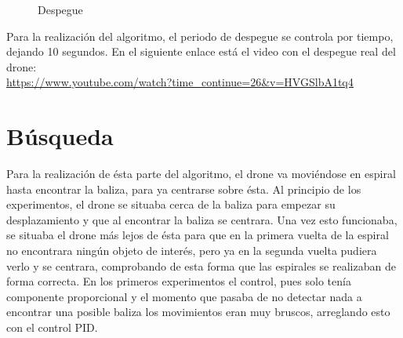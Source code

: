 \begin{figure}[H]
 \centering
 \caption{Despegue}
 \label{f:Test Despegue}
\end{figure}

Para la realizaci\'on del algoritmo, el periodo de despegue se controla por tiempo, dejando 10 segundos. 
En el siguiente enlace est\'a el video con el despegue real del drone:\\
\underline{\url{https://www.youtube.com/watch?time_continue=26&v=HVGSlbA1tq4}}

\section{B\'usqueda }
\hspace{1cm} Para la realizaci\'on de \'esta parte del algoritmo, el drone va movi\'endose en espiral hasta encontrar la baliza, para ya centrarse sobre \'esta. Al principio de los experimentos, el drone se situaba cerca de la baliza para empezar su desplazamiento y que al encontrar la baliza se centrara. Una vez esto funcionaba, se situaba el drone m\'as lejos de \'esta para que en la primera vuelta de la espiral no encontrara ning\'un objeto de inter\'es, pero ya en la segunda vuelta pudiera verlo y se centrara, comprobando de esta forma que las espirales se realizaban de forma correcta. En los primeros experimentos el control, pues solo ten\'ia componente proporcional y el momento que pasaba de no detectar nada a encontrar una posible baliza los movimientos eran muy bruscos, arreglando esto con el control PID. 

